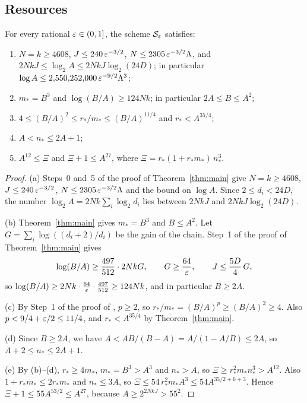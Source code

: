 \subsection{Resources}
\label{sec:seeds-resources}

\begin{lemma}[Resources]\label{lem:resources}
For every rational \(\varepsilon\in(0,1]\), the scheme \(\mathcal S_\varepsilon\)
satisfies:
\begin{enumerate}
\item[(a)] \(N=k\ge4608\), \(J\le240\,\varepsilon^{-3/2}\),
 \(N\le2305\,\varepsilon^{-3/2}\Lambda\), and
 \(2NkJ\le\log_2A\le2NkJ\log_2(24D)\); in particular
 \(\log A\le2{,}550{,}252{,}000\,\varepsilon^{-9/2}\Lambda^3\);
\item[(b)] \(m_*=B^3\) and \(\log(B/A)\ge124Nk\); in particular
 \(2A\le B\le A^2\);
\item[(c)] \(4\le(B/A)^2\le r_*/m_*\le(B/A)^{11/4}\) and
 \(r_*<A^{35/4}\);
\item[(d)] \(A<n_*\le2A+1\);
\item[(e)] \(A^{12}\le\Xi\) and \(\Xi+1\le A^{27}\), where
 \(\Xi=r_*(1+r_*m_*)\,n_*^3\).
\end{enumerate}
\end{lemma}

\begin{proof}
(a) Steps~0 and~5 of the proof of Theorem~\ref{thm:main} give
\(N=k\ge4608\), \(J\le240\,\varepsilon^{-3/2}\),
\(N\le2305\,\varepsilon^{-3/2}\Lambda\) and the bound on \(\log A\). Since
\(2\le d_i<24D\), the number \(\log_2A=2Nk\sum_i\log_2d_i\) lies between
\(2NkJ\) and \(2NkJ\log_2(24D)\).

(b) Theorem~\ref{thm:main} gives \(m_*=B^3\) and \(B\le A^2\). Let
\(G=\sum_i\log((d_i+2)/d_i)\) be the gain of the chain. Step~1 of the
proof of Theorem~\ref{thm:main} gives
\begin{equation}\label{eq:seeds-gain}
 \log(B/A)\ge\frac{497}{512}\cdot2NkG,\qquad
 G\ge\frac{64}{\varepsilon},\qquad J\le\frac{5D}4\,G,
\end{equation}
so \(\log(B/A)\ge2Nk\cdot\frac{64}{\varepsilon}\cdot\frac{497}{512}\ge124Nk\), and
in particular \(B\ge2A\).

(c) By Step~1 of the proof of \citep[Lemma~2.4]{FinCon26}, \(p\ge2\), so
\(r_*/m_*=(B/A)^p\ge(B/A)^2\ge4\). Also \(p<9/4+\varepsilon/2\le11/4\), and
\(r_*<A^{35/4}\) by Theorem~\ref{thm:main}.

(d) Since \(B\ge2A\), we have \(A<AB/(B-A)=A/(1-A/B)\le2A\), so
\(A+2\le n_*\le2A+1\).

(e) By (b)--(d), \(r_*\ge4m_*\), \(m_*=B^3>A^3\) and \(n_*>A\), so
\(\Xi\ge r_*^2m_*n_*^3>A^{12}\). Also \(1+r_*m_*\le2r_*m_*\) and
\(n_*\le3A\), so \(\Xi\le54\,r_*^2m_*A^3\le54A^{35/2+6+3}\). Hence
\(\Xi+1\le55A^{53/2}\le A^{27}\), because \(A\ge2^{2NkJ}>55^2\).
\end{proof}

